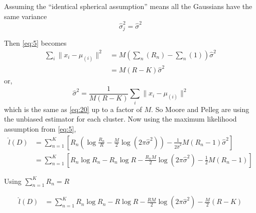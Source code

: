 \documentclass[letterpaper]{article}
\begin{document}
Assuming the ``identical spherical assumption'' means all the
Gaussians have the same variance
\begin{equation}
  \label{eq:6}
  \hat{\sigma}_j^2 = \hat{\sigma}^2
\end{equation}

Then \eqref{eq:5} becomes
\begin{align}
  \nonumber
  \sum_i \|x_i - \mu_{(i)}\|^2 &= M \left(\sum_n \left(R_n\right) - \sum_n\left( 1 \right)\right) \hat\sigma^2 \\
  \label{eq:7}
             &= M \left( R - K \right) \hat{\sigma}^2
\end{align}
or, 
\begin{equation}
  \label{eq:8}
  \hat{\sigma}^2 = \frac{1}{M(R-K)}\sum_{i} \| x_i - \mu_{(i)} \|^2
\end{equation}
which is the same as \eqref{eq:20} up to a factor of $M$.  So Moore and Pelleg are using the unbiased estimator for each cluster.  Now using the maximum likelihood assumption from \eqref{eq:5},
%
\begin{align}
  \label{eq:14}
  \hat{l}(D) &= \sum_{n=1}^K
                   \left[ R_n \left( \log \frac{R_n}{R}
                          - \frac{M}{2} \log \left(2 \pi \hat{\sigma}^2 \right) \right)
                   - \frac{1}{2\hat{\sigma}^2} M \left( R_n - 1 \right) \hat{\sigma}^2 \right] \\
             &= \sum_{n=1}^K \left[ R_n \log R_n - R_n \log R - \frac{R_nM}{2} \log \left(2 \pi \hat{\sigma}^2 \right)
                   - \frac{1}{2} M \left( R_n - 1 \right)\right]
\end{align}

Using $\sum_{n=1}^K R_n = R$

\begin{align}
  \label{eq:15}
  \hat{l}(D) &= \sum_{n=1}^K R_n \log R_n - R \log R - \frac{RM}{2} \log \left(2 \pi \hat{\sigma}^2 \right)
                   - \frac{M}{2} \left( R - K \right)
\end{align}
\end{document}

